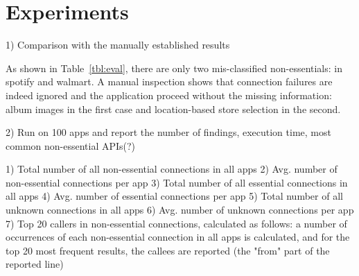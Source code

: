 \section{Experiments}
\label{sec:evaluation}


1) Comparison with the manually established results

As shown in Table~\ref{tbl:eval}, there are only two mis-classified non-essentials: in spotify and walmart. A manual inspection shows that connection failures are indeed ignored and the application proceed without the missing information: album images in the first case and location-based store selection in the second.



2) Run on 100 apps and report the number of findings, execution time, most common non-essential APIs(?) 

\begin{table}[t]
\caption{Insert Caption here.}
\label{tbl:insertTableLabelHere}
\centering
\tabcolsep=1.5pt
\end{table}


1) Total number of all non-essential connections in all apps
2) Avg. number of non-essential connections per app
3) Total number of all essential connections in all apps
4) Avg. number of essential connections per app
5) Total number of all unknown connections in all apps
6) Avg. number of unknown connections per app
7) Top 20 callers in non-essential connections, calculated as follows:
a number of occurrences of each non-essential connection in all apps
is calculated, and for the top 20 most frequent results, the callees
are reported (the "from" part of the reported line)
